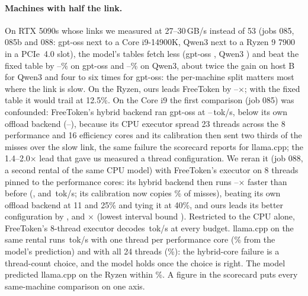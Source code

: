 \paragraph{Machines with half the link.} On RTX 5090s whose links we measured at 27--30\,GB/s instead of 53 (jobs
085, 085b and 088: gpt-oss next to a Core i9-14900K, Qwen3 next to a Ryzen 9 7900 in a PCIe~4.0 slot), the model's tables fetch less
(gpt-oss \texttt{\hpTableGpt}, Qwen3 \texttt{\hpTableQwen}) and beat the fixed table by \hpGptLawMin--\hpGptLawMax\% on
gpt-oss and \hpQwenLawMin--\hpQwenLawMax\% on Qwen3, about twice the gain on host B for Qwen3 and four to six times
for gpt-oss: the per-machine split matters most where the link is slow. On the Ryzen, ours leads FreeToken by
\hpQwenFtMin--\hpQwenFtMax$\times$; with the fixed table it would trail at 12.5\%. On the Core i9 the first comparison
(job 085) was confounded: FreeToken's hybrid backend ran gpt-oss at \iNineHybridMin--\iNineHybridMax\,tok/s, below its
own offload backend (\iNineOffloadMin--\iNineOffloadMax), because its CPU executor spread 23 threads across the 8
performance and 16 efficiency cores and its calibration then sent two thirds of the misses over the slow link, the
same failure the scorecard reports for llama.cpp; the 1.4--2.0$\times$ lead that gave us measured a thread
configuration. We reran it (job 088, a second rental of the same CPU model) with FreeToken's executor on 8 threads
pinned to the performance cores: its hybrid backend then runs \slHybGainMin--\slHybGainMax$\times$ faster than before
(\slHybLow, \slHybMid{} and \slHybHigh\,tok/s; its calibration now copies \slFetchFrac\% of misses), beating its own
offload backend at 11 and 25\% and tying it at 40\%, and ours leads its better configuration by \slFtLow, \slFtMid{}
and \slFtHigh$\times$ (lowest interval bound \slFtLoMin). Restricted to the CPU alone, FreeToken's 8-thread executor
decodes \slFzeroMid\,tok/s at every budget. llama.cpp on the same rental runs \slLlamaTeight\,tok/s with one thread
per performance core (\slLlamaErrTeight\% from the model's prediction) and \slLlamaTall{} with all 24 threads
(\slLlamaErrTall\%): the hybrid-core failure is a thread-count choice, and the model holds once the choice is right. The
model predicted llama.cpp on the Ryzen within \hpLlamaQwen\%. A figure in the scorecard puts every same-machine comparison on one
axis.

